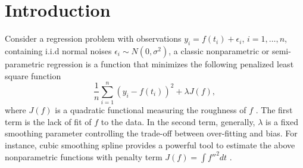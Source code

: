 

\section{Introduction}

%
%
%
%
%
%


Consider a regression problem with observations $y_i = f(t_i)+\epsilon_i$, $i=1,\ldots,n$, containing i.i.d normal noises $\epsilon_i\sim N(0,\sigma^2)$, a classic nonparametric or semi-parametric regression is a function that minimizes the following penalized least square function 
\begin{equation}
\frac{1}{n}\sum_{i=1}^{n}\left( y_i-f(t_i) \right)^2 + \lambda J(f),
\end{equation}
where $J(f)$ is a quadratic functional measuring the roughness of $f$ \cite{kim2004smoothing}. The first term is the lack of fit of $f$ to the data. In the second term, generally, $\lambda$ is a fixed smoothing parameter controlling the trade-off between over-fitting and bias. For instance, cubic smoothing spline provides a powerful tool to estimate the above nonparametric functions with penalty term $J(f) = \int f''^2dt$ \cite{hastie1990generalized}. 



